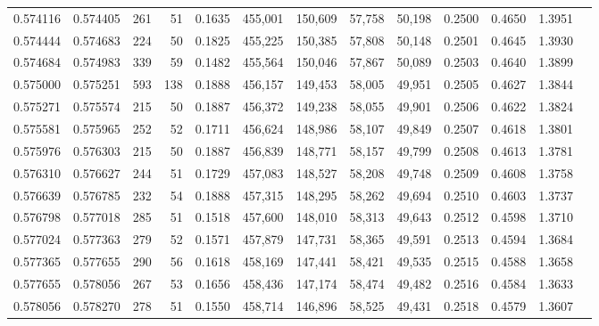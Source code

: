 \begin{tabular}{rrrrrrrrrrrrr}
0.574116 & 0.574405 &    261 &    51 &                                     0.1635 & 455,001 & 150,609 &  57,758 &  50,198 & 0.2500 & 0.4650 & 1.3951 \\
0.574444 & 0.574683 &    224 &    50 &                                     0.1825 & 455,225 & 150,385 &  57,808 &  50,148 & 0.2501 & 0.4645 & 1.3930 \\
0.574684 & 0.574983 &    339 &    59 &                                     0.1482 & 455,564 & 150,046 &  57,867 &  50,089 & 0.2503 & 0.4640 & 1.3899 \\
0.575000 & 0.575251 &    593 &   138 &                                     0.1888 & 456,157 & 149,453 &  58,005 &  49,951 & 0.2505 & 0.4627 & 1.3844 \\
0.575271 & 0.575574 &    215 &    50 &                                     0.1887 & 456,372 & 149,238 &  58,055 &  49,901 & 0.2506 & 0.4622 & 1.3824 \\
0.575581 & 0.575965 &    252 &    52 &                                     0.1711 & 456,624 & 148,986 &  58,107 &  49,849 & 0.2507 & 0.4618 & 1.3801 \\
0.575976 & 0.576303 &    215 &    50 &                                     0.1887 & 456,839 & 148,771 &  58,157 &  49,799 & 0.2508 & 0.4613 & 1.3781 \\
0.576310 & 0.576627 &    244 &    51 &                                     0.1729 & 457,083 & 148,527 &  58,208 &  49,748 & 0.2509 & 0.4608 & 1.3758 \\
0.576639 & 0.576785 &    232 &    54 &                                     0.1888 & 457,315 & 148,295 &  58,262 &  49,694 & 0.2510 & 0.4603 & 1.3737 \\
0.576798 & 0.577018 &    285 &    51 &                                     0.1518 & 457,600 & 148,010 &  58,313 &  49,643 & 0.2512 & 0.4598 & 1.3710 \\
0.577024 & 0.577363 &    279 &    52 &                                     0.1571 & 457,879 & 147,731 &  58,365 &  49,591 & 0.2513 & 0.4594 & 1.3684 \\
0.577365 & 0.577655 &    290 &    56 &                                     0.1618 & 458,169 & 147,441 &  58,421 &  49,535 & 0.2515 & 0.4588 & 1.3658 \\
0.577655 & 0.578056 &    267 &    53 &                                     0.1656 & 458,436 & 147,174 &  58,474 &  49,482 & 0.2516 & 0.4584 & 1.3633 \\
0.578056 & 0.578270 &    278 &    51 &                                     0.1550 & 458,714 & 146,896 &  58,525 &  49,431 & 0.2518 & 0.4579 & 1.3607 \\

\end{tabular}
